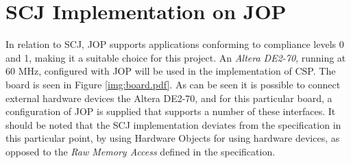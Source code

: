 \section{SCJ Implementation on JOP} %
\label{sec:scj_implementation_on_jop}
In relation to SCJ, JOP supports applications conforming to compliance levels 0 and 1, making it a suitable choice for this project. An \textit{Altera DE2-70}, running at 60 MHz, configured with JOP will be used in the implementation of CSP. The board is seen in Figure \ref{img:board.pdf}. As can be seen it is possible to connect external hardware devices the Altera DE2-70, and for this particular board, a configuration of JOP is supplied that supports a number of these interfaces.
It should be noted that the SCJ implementation deviates from the specification in this particular point, by using Hardware Objects\cite{Schoeberl:2011:HAL:2043662.2043666, Schoeberl:2008:HOJ:1371608.1372849} for using hardware devices, as opposed to the \textit{Raw Memory Access} defined in the specification.
